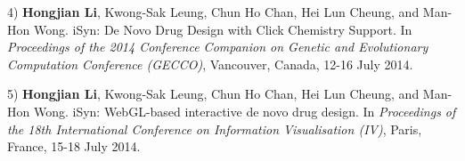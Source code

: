 4) \textbf{Hongjian Li}, Kwong-Sak Leung, Chun Ho Chan, Hei Lun Cheung, and Man-Hon Wong. iSyn: De Novo Drug Design with Click Chemistry Support. In \textit{Proceedings of the 2014 Conference Companion on Genetic and Evolutionary Computation Conference (GECCO)}, Vancouver, Canada, 12-16 July 2014.

5) \textbf{Hongjian Li}, Kwong-Sak Leung, Chun Ho Chan, Hei Lun Cheung, and Man-Hon Wong. iSyn: WebGL-based interactive de novo drug design. In \textit{Proceedings of the 18th International Conference on Information Visualisation (IV)}, Paris, France, 15-18 July 2014.

\chapterend

